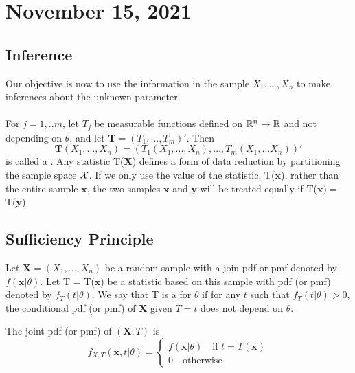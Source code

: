 \section{November 15, 2021}
\subsection{Inference}
Our objective is now to use the information in the sample $X_1,...,X_n$ to make inferences about the unknown parameter.
\\
\\ 
For $j = 1,..m$, let $T_j$ be measurable functions defined on $\mathbb R^n \to \mathbb R$ and not depending on $\theta$, and let $\boldsymbol{T} = (T_1,...,T_m)'$. Then
$$
\boldsymbol{T}(X_1,...,X_n) = \left(
T_1(X_1,...,X_n),...,T_m(X_1,...X_n)
\right)'
$$
is called a .
Any statistic T($\boldsymbol{X}$) defines a form of data reduction by partitioning the sample space $\mathcal X$. If we only use the value of the statistic, T($\boldsymbol{x}$), rather than the entire sample $\boldsymbol{x}$, the two samples $\boldsymbol{x}$ and $\boldsymbol{y}$ will be treated equally if T($\boldsymbol{x}) =$ T($\boldsymbol{y}$) 
\subsection{Sufficiency Principle}
\begin{definition}
    Let $\boldsymbol{X} = (X_1,...,X_n)$ be a random sample with a join pdf or pmf denoted by $f(\boldsymbol{x}|\theta)$. Let T = T($\boldsymbol{x}$)
    be a statistic based on this sample with pdf (or pmf) denoted by $f_T(t|\theta)$. We say that T is a  for $\theta$ if for any $t$ such that $f_T(t|\theta) > 0$, the conditional pdf (or pmf) of $\boldsymbol{X}$ given $T=t$ does not depend on $\theta$.
    \end{definition}
 The joint pdf (or pmf) of $(\boldsymbol{X},T)$ is 
    $$
    f_{X,T}(\boldsymbol{x},t| \theta) =
        \begin{cases}
            f(\boldsymbol{x}| \theta) \quad \text{if } t= T(\boldsymbol{x}) \\
            0 \quad \text{otherwise}
        \end{cases}
    $$